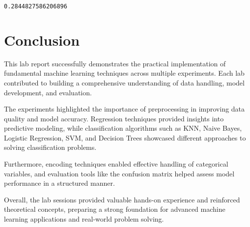 \documentclass[11pt,a4paper]{report}
\makeatletter
\newcommand{\boxspacing}{\kern\kvtcb@left@rule\kern\kvtcb@boxsep}
\newcommand{\prompt}[4]{
        {\ttfamily\llap{{\color{#2}[#3]:\hspace{3pt}#4}}\vspace{-\baselineskip}}
    }
\makeatother
\begin{document}
            \begin{tcolorbox}[breakable, size=fbox, boxrule=.5pt, pad at break*=1mm, opacityfill=0]
\prompt{Out}{outcolor}{28}{\boxspacing}
\begin{Verbatim}[commandchars=\\\{\}]
0.2844827586206896
\end{Verbatim}
\end{tcolorbox}


\chapter*{\center Conclusion}

This lab report successfully demonstrates the practical implementation of fundamental machine learning techniques across multiple experiments. Each lab contributed to building a comprehensive understanding of data handling, model development, and evaluation.

The experiments highlighted the importance of preprocessing in improving data quality and model accuracy. Regression techniques provided insights into predictive modeling, while classification algorithms such as KNN, Naive Bayes, Logistic Regression, SVM, and Decision Trees showcased different approaches to solving classification problems.

Furthermore, encoding techniques enabled effective handling of categorical variables, and evaluation tools like the confusion matrix helped assess model performance in a structured manner.

Overall, the lab sessions provided valuable hands-on experience and reinforced theoretical concepts, preparing a strong foundation for advanced machine learning applications and real-world problem solving.



        



    
    
    
\end{document}
